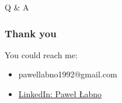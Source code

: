 \documentclass{beamer}
\begin{document}
\begin{section}{Q \& A}

\begin{frame}
\frametitle{Thank you}
You could reach me: \\

 \begin{itemize}
	  \item pawellabno1992@gmail.com
	  \item \href{https://www.linkedin.com/in/paweł-łabno-72160b68}{LinkedIn: Paweł Łabno}
\end{itemize}

\end{frame}


\end{section}
\end{document}
